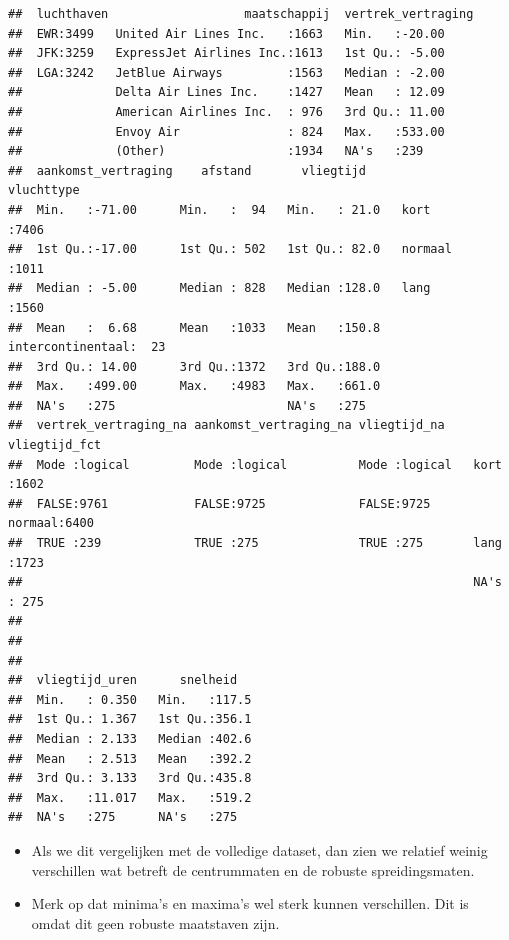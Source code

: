 \documentclass[]{tufte-book}
\providecommand{\tightlist}{%
  \setlength{\itemsep}{0pt}\setlength{\parskip}{0pt}}
\begin{document}
\begin{verbatim}
##  luchthaven                   maatschappij  vertrek_vertraging
##  EWR:3499   United Air Lines Inc.   :1663   Min.   :-20.00    
##  JFK:3259   ExpressJet Airlines Inc.:1613   1st Qu.: -5.00    
##  LGA:3242   JetBlue Airways         :1563   Median : -2.00    
##             Delta Air Lines Inc.    :1427   Mean   : 12.09    
##             American Airlines Inc.  : 976   3rd Qu.: 11.00    
##             Envoy Air               : 824   Max.   :533.00    
##             (Other)                 :1934   NA's   :239       
##  aankomst_vertraging    afstand       vliegtijd                 vluchttype  
##  Min.   :-71.00      Min.   :  94   Min.   : 21.0   kort             :7406  
##  1st Qu.:-17.00      1st Qu.: 502   1st Qu.: 82.0   normaal          :1011  
##  Median : -5.00      Median : 828   Median :128.0   lang             :1560  
##  Mean   :  6.68      Mean   :1033   Mean   :150.8   intercontinentaal:  23  
##  3rd Qu.: 14.00      3rd Qu.:1372   3rd Qu.:188.0                           
##  Max.   :499.00      Max.   :4983   Max.   :661.0                           
##  NA's   :275                        NA's   :275                             
##  vertrek_vertraging_na aankomst_vertraging_na vliegtijd_na    vliegtijd_fct 
##  Mode :logical         Mode :logical          Mode :logical   kort   :1602  
##  FALSE:9761            FALSE:9725             FALSE:9725      normaal:6400  
##  TRUE :239             TRUE :275              TRUE :275       lang   :1723  
##                                                               NA's   : 275  
##                                                                             
##                                                                             
##                                                                             
##  vliegtijd_uren      snelheid    
##  Min.   : 0.350   Min.   :117.5  
##  1st Qu.: 1.367   1st Qu.:356.1  
##  Median : 2.133   Median :402.6  
##  Mean   : 2.513   Mean   :392.2  
##  3rd Qu.: 3.133   3rd Qu.:435.8  
##  Max.   :11.017   Max.   :519.2  
##  NA's   :275      NA's   :275
\end{verbatim}

\begin{itemize}
\tightlist
\item
  Als we dit vergelijken met de volledige dataset, dan zien we relatief weinig verschillen wat betreft de centrummaten en de robuste spreidingsmaten.
\item
  Merk op dat minima's en maxima's wel sterk kunnen verschillen. Dit is omdat dit geen robuste maatstaven zijn.
\end{itemize}
\end{document}
